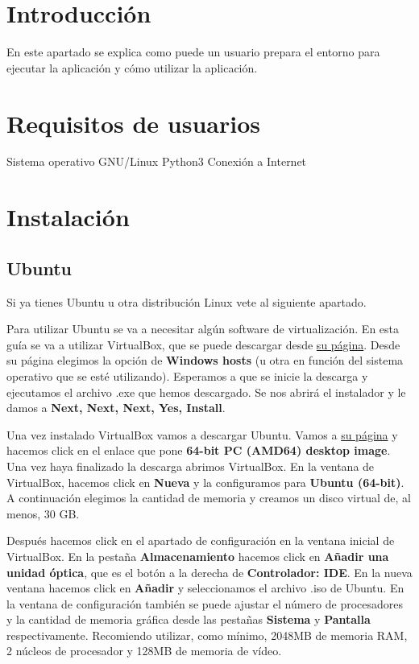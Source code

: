 
\section{Introducción}

En este apartado se explica como puede un usuario prepara el entorno para ejecutar la aplicación y cómo utilizar la aplicación.

\section{Requisitos de usuarios}

Sistema operativo GNU/Linux
Python3
Conexión a Internet

\section{Instalación}

\subsection{Ubuntu}

Si ya tienes Ubuntu u otra distribución Linux vete al siguiente apartado.

Para utilizar Ubuntu se va a necesitar algún software de virtualización. En esta guía se va a utilizar VirtualBox, que se puede descargar desde \href{https://www.virtualbox.org/wiki/Downloads}{su página}.
Desde su página elegimos la opción de \textbf{Windows hosts} (u otra en función del sistema operativo que se esté utilizando). Esperamos a que se inicie la descarga y ejecutamos el archivo .exe que hemos descargado. Se nos abrirá el instalador y le damos a \textbf{Next, Next, Next, Yes, Install}.

Una vez instalado VirtualBox vamos a descargar Ubuntu. Vamos a \href{https://releases.ubuntu.com/18.04.4/}{su página} y hacemos click en el enlace que pone \textbf{64-bit PC (AMD64) desktop image}. Una vez haya finalizado la descarga abrimos VirtualBox. En la ventana de VirtualBox, hacemos click en \textbf{Nueva} y la configuramos para \textbf{Ubuntu (64-bit)}. A continuación elegimos la cantidad de memoria y creamos un disco virtual de, al menos, 30 GB.

 

Después hacemos click en el apartado de configuración en la ventana inicial de VirtualBox. En la pestaña \textbf{Almacenamiento} hacemos click en \textbf{Añadir una unidad óptica}, que es el botón a la derecha de \textbf{Controlador: IDE}. En la nueva ventana hacemos click en \textbf{Añadir} y seleccionamos el archivo .iso de Ubuntu. En la ventana de configuración también se puede ajustar el número de procesadores y la cantidad de memoria gráfica desde las pestañas \textbf{Sistema} y \textbf{Pantalla} respectivamente. Recomiendo utilizar, como mínimo, 2048MB de memoria RAM, 2 núcleos de procesador y 128MB de memoria de vídeo.

